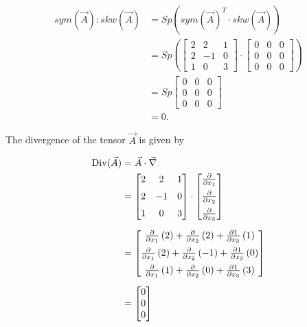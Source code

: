 \documentclass[12pt,bibstyle=none,pagenumberinfooter]{ifmdocument}
\begin{document}
\begin{align}
    sym(\Vec{A}):skw(\vec{A})
     & = Sp\left(sym(\Vec{A})^T \cdot skw(\Vec{A}) \right)                            \\
     & = Sp \left(\begin{bmatrix}
            2 & 2 & 1 \\ 2 & -1 & 0 \\ 1 & 0 & 3
        \end{bmatrix} \cdot \begin{bmatrix}
            0 & 0 & 0 \\ 0 & 0 & 0 \\ 0 & 0 & 0
        \end{bmatrix} \right) \\
     & = Sp \begin{bmatrix}
        0 & 0 & 0 \\ 0 & 0 & 0 \\ 0 & 0 & 0
    \end{bmatrix}                                                \\
     & = 0.
\end{align}

The divergence of the tensor $ \Vec{A}$ is given by

\begin{align}
    \operatorname{Div}(\Vec{A})
     & = \Vec{A} \cdot \Vec{\nabla}                                  \\
     & = \begin{bmatrix}
        2 & 2 & 1 \\[2mm] 2 & -1 & 0 \\[2mm] 1 & 0 & 3
    \end{bmatrix} \cdot \begin{bmatrix}
        \frac{\partial}{\partial x_1} \\[2mm] \frac{\partial}{\partial x_2} \\[2mm]  \frac{\partial}{\partial x_3}
    \end{bmatrix} \\[2mm]
     & = \begin{bmatrix}
        \frac{\partial}{\partial x_1}\,(2) + \frac{\partial}{\partial x_2}\, (2) + \frac{\partial 1}{\partial x_3}\, (1)  \\[2mm]
        \frac{\partial}{\partial x_1}\,(2) + \frac{\partial}{\partial x_2}\, (-1) + \frac{\partial 1}{\partial x_3}\, (0) \\[2mm]
        \frac{\partial}{\partial x_1}\,(1) + \frac{\partial}{\partial x_2}\, (0) + \frac{\partial 1}{\partial x_3}\, (3)  \\
    \end{bmatrix}                                  \\[2mm]
     & = \begin{bmatrix}
        0 \\ 0 \\ 0
    \end{bmatrix}
\end{align}
\end{document}
